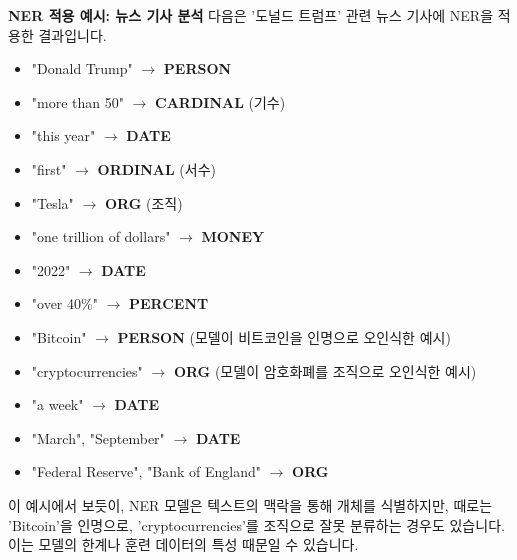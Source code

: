 \documentclass[11pt,a4paper]{article}
\theoremstyle{definition}
\begin{document}
\begin{examplebox}
\textbf{NER 적용 예시: 뉴스 기사 분석}
다음은 '도널드 트럼프' 관련 뉴스 기사에 NER을 적용한 결과입니다.
\begin{itemize}
    \item "Donald Trump" $\rightarrow$ \textbf{PERSON}
    \item "more than 50" $\rightarrow$ \textbf{CARDINAL} (기수)
    \item "this year" $\rightarrow$ \textbf{DATE}
    \item "first" $\rightarrow$ \textbf{ORDINAL} (서수)
    \item "Tesla" $\rightarrow$ \textbf{ORG} (조직)
    \item "one trillion of dollars" $\rightarrow$ \textbf{MONEY}
    \item "2022" $\rightarrow$ \textbf{DATE}
    \item "over 40\%" $\rightarrow$ \textbf{PERCENT}
    \item "Bitcoin" $\rightarrow$ \textbf{PERSON} (모델이 비트코인을 인명으로 오인식한 예시)
    \item "cryptocurrencies" $\rightarrow$ \textbf{ORG} (모델이 암호화폐를 조직으로 오인식한 예시)
    \item "a week" $\rightarrow$ \textbf{DATE}
    \item "March", "September" $\rightarrow$ \textbf{DATE}
    \item "Federal Reserve", "Bank of England" $\rightarrow$ \textbf{ORG}
\end{itemize}
이 예시에서 보듯이, NER 모델은 텍스트의 맥락을 통해 개체를 식별하지만, 때로는 'Bitcoin'을 인명으로, 'cryptocurrencies'를 조직으로 잘못 분류하는 경우도 있습니다. 이는 모델의 한계나 훈련 데이터의 특성 때문일 수 있습니다.
\end{examplebox}
\end{document}
